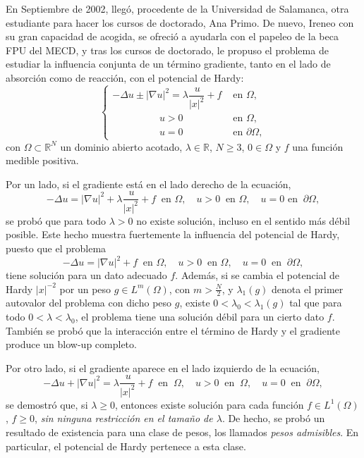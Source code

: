 En Septiembre de 2002, lleg\'o, procedente de la Universidad de Salamanca, otra estudiante para hacer los cursos de doctorado, Ana Primo. De nuevo, Ireneo con su gran capacidad de acogida, se ofreci\'o a ayudarla con el papeleo de la beca FPU del MECD, y tras los cursos de doctorado, le propuso el problema de estudiar la influencia conjunta de un t\'ermino gradiente, tanto en el lado de absorci\'on como de reacci\'on, con el potencial de Hardy:
$$
\left\{\begin{array}{ll}
-\Delta u\pm |\nabla u|^2=\lambda\dfrac{\,u}{|x|^{2}}+ f&\mbox{ en } \Omega,\\
\hspace{2cm}u>0&\mbox{ en } \Omega,\\
\hspace{2cm}u=0&\mbox{ en }\partial\Omega,
\end{array}\right.
$$
con $\Omega\subset\mathbb{R}^N$ un dominio abierto acotado, $\lambda\in \mathbb{R}$, $N\geq 3$, $0\in\Omega$ y $f$ una funci\'on medible positiva.

Por un lado, si el gradiente est\'a en el lado derecho de la ecuaci\'on, 
$$
-\Delta u= |\nabla u|^2+\lambda\dfrac{\,u}{|x|^{2}}+ f\ \mbox{ en } \Omega,\quad u>0\ \mbox{ en }\Omega,\quad u=0\mbox{ en }\ \partial \Omega,
$$
se prob\'o que  para todo $\lambda>0$ no existe soluci\'on, incluso en el sentido m\'as d\'ebil posible. Este hecho muestra fuertemente la influencia del potencial de Hardy, puesto que el problema 
$$
-\Delta u= |\nabla u|^2+ f\ \mbox{ en }\Omega,\quad u>0\ \mbox{ en }\Omega,\quad u=0\ \mbox{ en }\ \partial\Omega,
$$
tiene soluci\'on para un dato adecuado $f$. Adem\'as, si se cambia el potencial de Hardy $|x|^{-2}$ por un peso $g\in L^m(\Omega)$, con 
$m>\frac N2$, y $\lambda_1(g)$ denota el primer autovalor del problema con dicho peso $g$, existe $0<\lambda_0<\lambda_1(g)$ tal que para todo 
$0<\lambda<\lambda_0$, el problema tiene una soluci\'on d\'ebil para un cierto dato $f$. Tambi\'en se prob\'o que la interacci\'on entre el t\'ermino de Hardy y el gradiente produce un blow-up completo. 

Por otro lado, si el gradiente aparece en el lado izquierdo de la ecuaci\'on,
$$
-\Delta u+|\nabla u|^2=\lambda\dfrac{\,u}{|x|^{2}}+ f\ \mbox{ en }\ \Omega,\quad u>0\ \mbox{ en }\ \Omega,\quad u=0\ \mbox{ en }\ \partial \Omega,
$$
se demostr\'o que, si  $\lambda\ge 0$, entonces existe soluci\'on para cada funci\'on $f\in L^1(\Omega)$, $f\geq 0$, {\it sin ninguna restricci\'on en el tama\~{n}o de  $\lambda$}. De hecho, se prob\'o un resultado de existencia para una clase de pesos, los llamados {\it pesos admisibles}. En particular, el potencial de Hardy pertenece a esta clase.  

